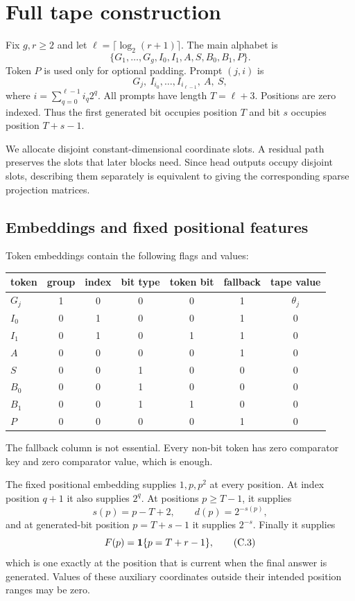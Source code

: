 \section{Full tape construction}\label{app:construction}

Fix $g,r\geq2$ and let $\ell=\lceil\log_2(r+1)\rceil$. The main alphabet is
\[
 \{G_1,\ldots,G_g,I_0,I_1,A,S,B_0,B_1,P\}.
\]
Token $P$ is used only for optional padding. Prompt $(j,i)$ is
\[
 G_j,\ I_{i_0},\ldots,I_{i_{\ell-1}},\ A,\ S,
 \tag{C.1}
\]
where $i=\sum_{q=0}^{\ell-1}i_q2^q$. All prompts have length
$T=\ell+3$. Positions are zero indexed. Thus the first generated bit occupies position $T$ and
bit $s$ occupies position $T+s-1$.

We allocate disjoint constant-dimensional coordinate slots. A residual path preserves the slots that
later blocks need. Since head outputs occupy disjoint slots, describing them separately is
equivalent to giving the corresponding sparse projection matrices.

\subsection{Embeddings and fixed positional features}

Token embeddings contain the following flags and values:
\begin{center}
\begin{tabular}{lcccccc}
\toprule
token & group & index & bit type & token bit & fallback & tape value\\
\midrule
$G_j$ & 1 & 0 & 0 & 0 & 1 & $\theta_j$\\
$I_0$ & 0 & 1 & 0 & 0 & 1 & 0\\
$I_1$ & 0 & 1 & 0 & 1 & 1 & 0\\
$A$   & 0 & 0 & 0 & 0 & 1 & 0\\
$S$   & 0 & 0 & 1 & 0 & 0 & 0\\
$B_0$ & 0 & 0 & 1 & 0 & 0 & 0\\
$B_1$ & 0 & 0 & 1 & 1 & 0 & 0\\
$P$   & 0 & 0 & 0 & 0 & 1 & 0\\
\bottomrule
\end{tabular}
\end{center}
The fallback column is not essential. Every non-bit token has zero comparator key and zero
comparator value, which is enough.

The fixed positional embedding supplies $1,p,p^2$ at every position. At index position $q+1$ it
also supplies $2^q$. At positions $p\geq T-1$, it supplies
\[
 s(p)=p-T+2,
 \qquad d(p)=2^{-s(p)},
 \tag{C.2}
\]
and at generated-bit position $p=T+s-1$ it supplies $2^{-s}$. Finally it supplies
\[
 F(p)=\mathbf 1\{p=T+r-1\},
 \tag{C.3}
\]
which is one exactly at the position that is current when the final answer is generated. Values of
these auxiliary coordinates outside their intended position ranges may be zero.

